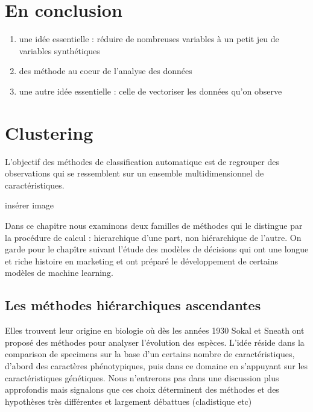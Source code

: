 \documentclass[
]{book}
\begin{document}
\hypertarget{en-conclusion}{%
\chapter{En conclusion}\label{en-conclusion}}

\begin{enumerate}
\def\labelenumi{\arabic{enumi})}
\item
  une idée essentielle : réduire de nombreuses variables à un petit jeu de variables synthétiques
\item
  des méthode au coeur de l'analyse des données
\item
  une autre idée essentielle : celle de vectoriser les données qu'on observe
\end{enumerate}

\hypertarget{clus}{%
\chapter{Clustering}\label{clus}}

L'objectif des méthodes de classification automatique est de regrouper des observations qui se ressemblent sur un ensemble multidimensionnel de caractéristiques.

insérer image

Dans ce chapitre nous examinons deux familles de méthodes qui le distingue par la procédure de calcul : hierarchique d'une part, non hiérarchique de l'autre. On garde pour le chapître suivant l'étude des modèles de décisions qui ont une longue et riche histoire en marketing et ont préparé le développement de certains modèles de machine learning.

\hypertarget{les-muxe9thodes-hiuxe9rarchiques-ascendantes}{%
\section{Les méthodes hiérarchiques ascendantes}\label{les-muxe9thodes-hiuxe9rarchiques-ascendantes}}

Elles trouvent leur origine en biologie où dès les années 1930 Sokal et Sneath\citep{sneath_numerical_1973} ont proposé des méthodes pour analyser l'évolution des espèces. L'idée réside dans la comparison de specimens sur la base d'un certains nombre de caractéristiques, d'abord des caractères phénotypiques, puis dans ce domaine en s'appuyant sur les caractéristiques génétiques. Nous n'entrerons pas dans une discussion plus approfondis mais signalons que ces choix déterminent des méthodes et des hypothèses très différentes et largement débattues (cladistique etc)
\end{document}
